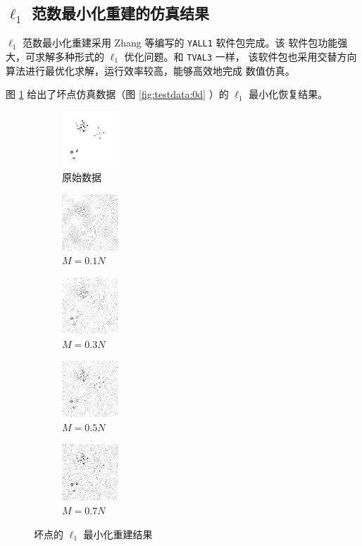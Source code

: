\subsection{$\ell_1$ 范数最小化重建的仿真结果}

$\ell_1$ 范数最小化重建采用 Zhang 等编写的 \verb|YALL1| 软件包完成。该
软件包功能强大，可求解多种形式的 $\ell_1$ 优化问题。和 \verb|TVAL3| 一样，
该软件包也采用交替方向算法进行最优化求解，运行效率较高，能够高效地完成
数值仿真。

图 \ref{fig:l10d} 给出了坏点仿真数据（图 
\ref{fig:testdata:0d} ）的 $\ell_1$ 最小化恢复结果。

\begin{figure}
\centering
\begin{subfigure}[t]{1.1in}
	\includegraphics{Figure/testdata/0d.png}
	\caption{原始数据}
\end{subfigure}
\begin{subfigure}[t]{1.1in}
	\includegraphics{Figure/L1/0d10.png}
	\caption{$M = 0.1 N$}
\end{subfigure}
\begin{subfigure}[t]{1.1in}
	\includegraphics{Figure/L1/0d30.png}
	\caption{$M = 0.3 N$}
\end{subfigure}
\begin{subfigure}[t]{1.1in}
	\includegraphics{Figure/L1/0d50.png}
	\caption{$M = 0.5 N$}
\end{subfigure}
\begin{subfigure}[t]{1.1in}
	\includegraphics{Figure/L1/0d70.png}
	\caption{$M = 0.7 N$}
\end{subfigure}
\caption{坏点的 $\ell_1$ 最小化重建结果}
\label{fig:l10d}
\end{figure}

